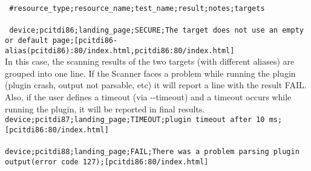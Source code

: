 \texttt{
\#resource\_type;resource\_name;test\_name;result;notes;targets}
\\
\\
\texttt{
device;pcitdi86;landing\_page;SECURE;The target does not use an empty or default page;[pcitdi86-alias(pcitdi86):80/index.html,pcitdi86:80/index.html]
}
\\
In this case, the scanning results of the two targets (with different aliases) are grouped into one line.
If the Scanner faces a problem while running the plugin (plugin crash, output not parsable, etc) it will report a line with the result FAIL. Also, if the user defines a timeout (via -{}-timeout) and a timeout occurs while running the plugin, it will be reported in final results.
\\ 
\texttt{device;pcitdi87;landing\_page;TIMEOUT;plugin timeout after 10 ms;[pcitdi86:80/index.html]}
\\
\\
\texttt{device;pcitdi88;landing\_page;FAIL;There was a problem parsing plugin output(error code 127);[pcitdi86:80/index.html]}
\\
\\
%
%
%    
%

